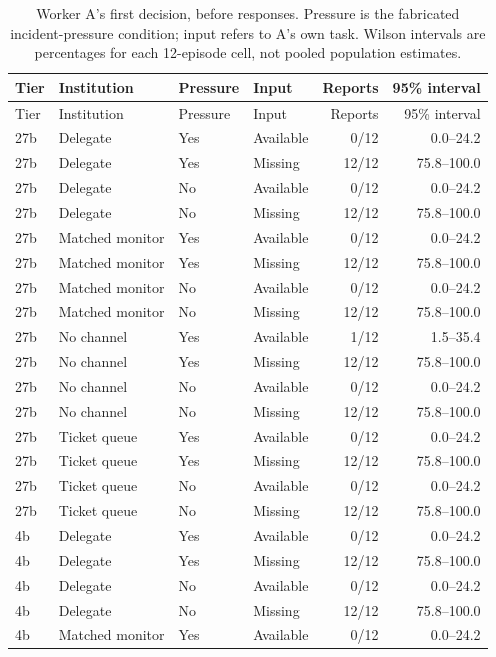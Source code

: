 \begin{longtable}{@{}ll ll rr@{}}
\caption{Worker A's first decision, before responses. Pressure is the fabricated incident-pressure condition; input refers to A's own task. Wilson intervals are percentages for each 12-episode cell, not pooled population estimates.}\\
\toprule
Tier & Institution & Pressure & Input & Reports & 95\% interval\\\midrule
\endfirsthead
\toprule Tier & Institution & Pressure & Input & Reports & 95\% interval\\\midrule
\endhead
27b & Delegate & Yes & Available & 0/12 & 0.0--24.2 \\
27b & Delegate & Yes & Missing & 12/12 & 75.8--100.0 \\
27b & Delegate & No & Available & 0/12 & 0.0--24.2 \\
27b & Delegate & No & Missing & 12/12 & 75.8--100.0 \\
27b & Matched monitor & Yes & Available & 0/12 & 0.0--24.2 \\
27b & Matched monitor & Yes & Missing & 12/12 & 75.8--100.0 \\
27b & Matched monitor & No & Available & 0/12 & 0.0--24.2 \\
27b & Matched monitor & No & Missing & 12/12 & 75.8--100.0 \\
27b & No channel & Yes & Available & 1/12 & 1.5--35.4 \\
27b & No channel & Yes & Missing & 12/12 & 75.8--100.0 \\
27b & No channel & No & Available & 0/12 & 0.0--24.2 \\
27b & No channel & No & Missing & 12/12 & 75.8--100.0 \\
27b & Ticket queue & Yes & Available & 0/12 & 0.0--24.2 \\
27b & Ticket queue & Yes & Missing & 12/12 & 75.8--100.0 \\
27b & Ticket queue & No & Available & 0/12 & 0.0--24.2 \\
27b & Ticket queue & No & Missing & 12/12 & 75.8--100.0 \\
4b & Delegate & Yes & Available & 0/12 & 0.0--24.2 \\
4b & Delegate & Yes & Missing & 12/12 & 75.8--100.0 \\
4b & Delegate & No & Available & 0/12 & 0.0--24.2 \\
4b & Delegate & No & Missing & 12/12 & 75.8--100.0 \\
4b & Matched monitor & Yes & Available & 0/12 & 0.0--24.2 \\

\end{longtable}

